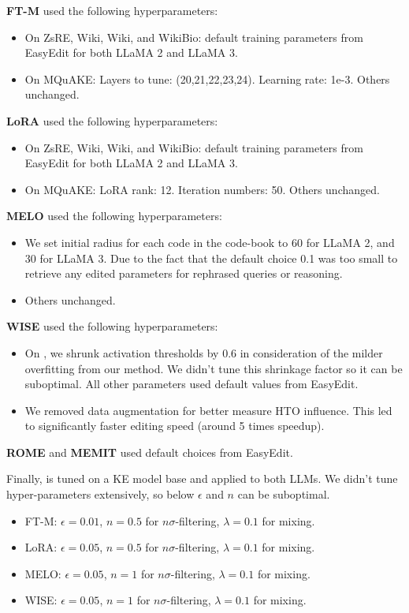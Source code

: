 \textbf{FT-M} used the following hyperparameters:
\begin{itemize}
    \item On ZsRE, Wiki, Wiki, and WikiBio: default training parameters from EasyEdit for both LLaMA 2 and LLaMA 3. 
    \item On MQuAKE: Layers to tune: {(20,21,22,23,24)}. Learning rate: {1e-3}. Others unchanged. 
\end{itemize}

\textbf{LoRA} used the following hyperparameters:
\begin{itemize}
    \item On ZsRE, Wiki, Wiki, and WikiBio: default training parameters from EasyEdit for both LLaMA 2 and LLaMA 3. 
    \item On MQuAKE: LoRA rank: {12}. Iteration numbers: {50}. Others unchanged. 
\end{itemize}

\textbf{MELO} used the following hyperparameters:
\begin{itemize}
    \item We set initial radius for each code in the code-book to 60 for LLaMA 2, and 30 for LLaMA 3. 
    Due to the fact that the default choice 0.1 was too small to retrieve any edited parameters for rephrased queries or reasoning. 
    
    \item 
    Others unchanged. 
    
\end{itemize}


\textbf{WISE} used the following hyperparameters:
\begin{itemize}
    \item 
    On {\NAME}, we shrunk activation thresholds by 0.6 in consideration of the milder overfitting from our method. 
    We didn't tune this shrinkage factor so it can be suboptimal. All other parameters used default values from EasyEdit. 

    \item
    We removed data augmentation for better measure HTO influence. This led to significantly faster editing speed (around 5 times speedup). 
\end{itemize}


\textbf{ROME} and \textbf{MEMIT} used default choices from EasyEdit. 


Finally, {\NAME} is tuned on a KE model base and applied to both LLMs. 
We didn't tune hyper-parameters extensively, so below $\epsilon$ and $n$ can be suboptimal. 
\begin{itemize}
    \item FT-M: $\epsilon = 0.01$, $n = 0.5$ for $n \sigma$-filtering, $\lambda = 0.1$ for mixing. 
    \item LoRA: $\epsilon = 0.05$, $n = 0.5$ for $n \sigma$-filtering, $\lambda = 0.1$ for mixing. 
    \item MELO: $\epsilon = 0.05$, $n = 1$ for $n \sigma$-filtering, $\lambda = 0.1$ for mixing. 
    \item WISE: $\epsilon = 0.05$, $n = 1$ for $n \sigma$-filtering, $\lambda = 0.1$ for mixing. 
\end{itemize}


